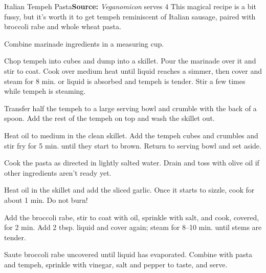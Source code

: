\begin{recipe}{Italian Tempeh Pasta}{}{\textbf{Source:} \textit{Veganomicon} \hfill serves 4}
  \freeform This magical recipe is a bit fussy, but it's worth it to get tempeh reminiscent of Italian sausage, paired with broccoli rabe and whole wheat pasta.

Combine marinade ingredients in a measuring cup.

Chop tempeh into cubes and dump into a skillet. Pour the marinade over it and stir to coat. Cook over medium heat until liquid reaches a simmer, then cover and steam for 8 min. or liquid is absorbed and tempeh is tender. Stir a few times while tempeh is steaming.

\newstep Transfer half the tempeh to a large serving bowl and crumble with the back of a spoon. Add the rest of the tempeh on top and wash the skillet out.

Heat oil to medium in the clean skillet. Add the tempeh cubes and crumbles and stir fry for 5 min. until they start to brown. Return to serving bowl and set aside.

Cook the pasta as directed in lightly salted water. Drain and toss with olive oil if other ingredients aren't ready yet.

Heat oil in the skillet and add the sliced garlic. Once it starts to sizzle, cook for about 1 min. Do not burn!

Add the broccoli rabe, stir to coat with oil, sprinkle with salt, and cook, covered, for 2 min. Add 2 tbsp. liquid and cover again; steam for 8--10 min. until stems are tender.

Saute broccoli rabe uncovered until liquid has evaporated. Combine with pasta and tempeh, sprinkle with vinegar, salt and pepper to taste, and serve.
\end{recipe}